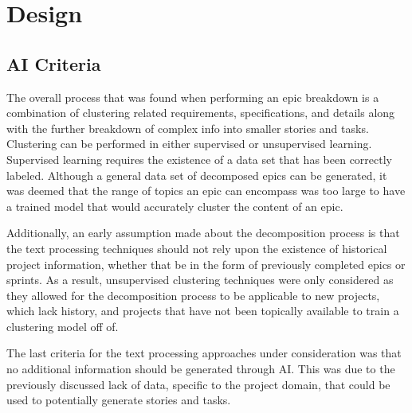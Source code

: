 \section{Design}

\subsection{AI Criteria}

\label{subsection:criteria}
The overall process that was found when performing an epic breakdown is a combination of clustering related requirements, specifications, and details along with the further breakdown of complex info into smaller stories and tasks. Clustering can be performed in either supervised or unsupervised learning. Supervised learning requires the existence of a data set that has been correctly labeled. Although a general data set of decomposed epics can be generated, it was deemed that the range of topics an epic can encompass was too large to have a trained model that would accurately cluster the content of an epic. 

Additionally, an early assumption made about the decomposition process is that the text processing techniques should not rely upon the existence of historical project information, whether that be in the form of previously completed epics or sprints. As a result, unsupervised clustering techniques were only considered as they allowed for the decomposition process to be applicable to new projects, which lack history, and projects that have not been topically available to train a clustering model off of.

The last criteria for the text processing approaches under consideration was that no additional information should be generated through AI. This was due to the previously discussed lack of data, specific to the project domain, that could be used to potentially generate stories and tasks.

